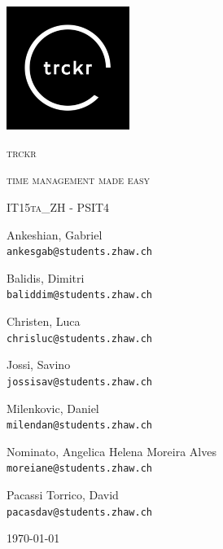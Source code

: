 \documentclass[bibliography=totoc, listof=totocnumbered]{scrartcl}
\begin{document}
\begin{titlepage}
\thispagestyle{firstpage}
\centering
\includegraphics[width=0.3\textwidth]{logo}\par
\vspace{1cm}

{\scshape\LARGE trckr \par}
\vspace{0.3cm}

{\scshape\Large time management made easy\par}
\vspace{0.5cm}

{\scshape IT15ta\_ZH - PSIT4\par}
\vspace{0.5cm}
Ankeshian, Gabriel\\
\texttt{ankesgab@students.zhaw.ch}

\vspace{0.2cm}
Balidis, Dimitri\\
\texttt{baliddim@students.zhaw.ch}

\vspace{0.2cm}
Christen, Luca\\
\texttt{chrisluc@students.zhaw.ch}

\vspace{0.2cm}
Jossi, Savino\\
\texttt{jossisav@students.zhaw.ch}

\vspace{0.2cm}
Milenkovic, Daniel\\
\texttt{milendan@students.zhaw.ch}

\vspace{0.2cm}
Nominato, Angelica Helena Moreira Alves\\
\texttt{moreiane@students.zhaw.ch}

\vspace{0.2cm}
Pacassi Torrico, David\\
\texttt{pacasdav@students.zhaw.ch}

\vfill

	{\large \today\par}
\end{titlepage}
\end{document}
